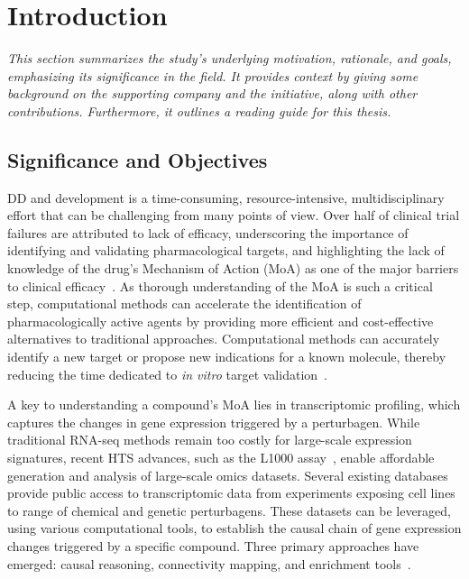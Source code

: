 ﻿%

%

\makeatletter
\newcommand{\ntifpkgloaded}{%
  \@ifpackageloaded%
}
\makeatother

\chapter{Introduction}
\label{cha:introduction}

\textit{This section summarizes the study's underlying motivation, rationale, and goals, emphasizing its significance in the field. It provides context by giving some background on the supporting company and the initiative, along with other contributions. Furthermore, it outlines a reading guide for this thesis.}

\section{Significance and Objectives} %
\label{sec:significanceandobjectives}


\gls{DD} and development is a time-consuming, resource-intensive, multidisciplinary effort that can be challenging from many points of view. 
Over half of clinical trial failures are attributed to lack of efficacy, underscoring the importance of identifying and validating pharmacological targets, and highlighting the lack of knowledge of the drug's \gls{Mechanism of Action (MoA)} as one of the major barriers to clinical efficacy~\cite{RN3, RN1, RN2}. 
As thorough understanding of the \gls{MoA} is such a critical step, computational methods can accelerate the identification of pharmacologically active agents by providing more efficient and cost-effective alternatives to traditional approaches. 
Computational methods can accurately identify a new target or propose new indications for a known molecule, thereby reducing the time dedicated to \textit{in vitro} target validation~\cite{RN29}.

A key to understanding a compound's \gls{MoA} lies in transcriptomic profiling, which captures the changes in gene expression triggered by a perturbagen. 
While traditional \gls{RNA-seq} methods remain too costly for large-scale expression signatures, recent \gls{HTS} advances, such as the L1000 assay~\cite{RN30}, enable affordable generation and analysis of large-scale omics datasets. 
Several existing databases provide public access to transcriptomic data from experiments exposing cell lines to range of chemical and genetic perturbagens. 
These datasets can be leveraged, using various computational tools, to establish the causal chain of gene expression changes triggered by a specific compound. 
Three primary approaches have emerged: causal reasoning, connectivity mapping, and enrichment tools~\cite{RN38}.

